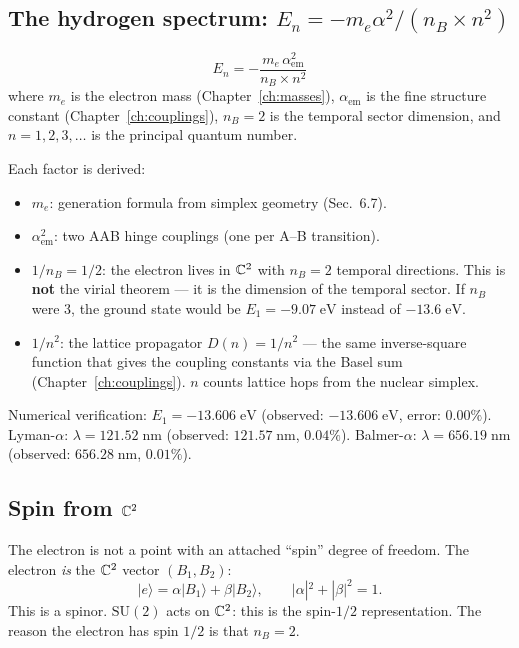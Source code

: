 \subsection{The hydrogen spectrum: $E_n = -m_e\alpha^2/(n_B \times n^2)$}

\begin{theorem}
\begin{equation}
\boxed{E_n = -\frac{m_e\,\alpha_\text{em}^2}{n_B \times n^2}}
\end{equation}
where $m_e$ is the electron mass (Chapter~\ref{ch:masses}), $\alpha_\text{em}$ is the fine structure constant (Chapter~\ref{ch:couplings}), $n_B = 2$ is the temporal sector dimension, and $n = 1, 2, 3, \ldots$ is the principal quantum number.
\end{theorem}

Each factor is derived:
\begin{itemize}
\item $m_e$: generation formula from simplex geometry (Sec.~6.7).
\item $\alpha_\text{em}^2$: two AAB hinge couplings (one per A--B transition).
\item $1/n_B = 1/2$: the electron lives in $\mathbb{C}^2$ with $n_B = 2$ temporal directions. This is \textbf{not} the virial theorem --- it is the dimension of the temporal sector. If $n_B$ were 3, the ground state would be $E_1 = -9.07\;\text{eV}$ instead of $-13.6\;\text{eV}$.
\item $1/n^2$: the lattice propagator $D(n) = 1/n^2$ --- the same inverse-square function that gives the coupling constants via the Basel sum (Chapter~\ref{ch:couplings}). $n$ counts lattice hops from the nuclear simplex.
\end{itemize}

Numerical verification: $E_1 = -13.606\;\text{eV}$ (observed: $-13.606\;\text{eV}$, error: $0.00\%$). Lyman-$\alpha$: $\lambda = 121.52\;\text{nm}$ (observed: $121.57\;\text{nm}$, $0.04\%$). Balmer-$\alpha$: $\lambda = 656.19\;\text{nm}$ (observed: $656.28\;\text{nm}$, $0.01\%$).

\subsection{Spin from $\mathbb{C}^2$}

The electron is not a point with an attached ``spin'' degree of freedom. The electron \emph{is} the $\mathbb{C}^2$ vector $(B_1, B_2)$:
\begin{equation}
|e\rangle = \alpha|B_1\rangle + \beta|B_2\rangle, \qquad |\alpha|^2 + |\beta|^2 = 1.
\end{equation}
This is a spinor. $\text{SU}(2)$ acts on $\mathbb{C}^2$: this is the spin-$1/2$ representation. The reason the electron has spin $1/2$ is that $n_B = 2$.

